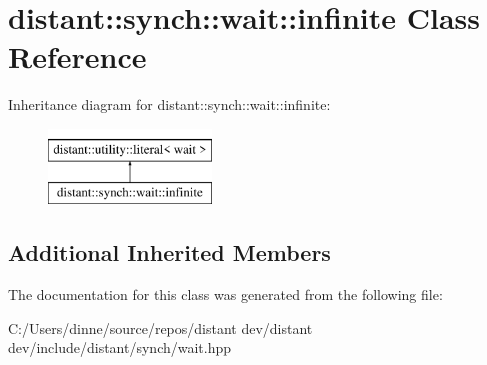 \hypertarget{classdistant_1_1synch_1_1wait_1_1infinite}{}\section{distant\+:\+:synch\+:\+:wait\+:\+:infinite Class Reference}
\label{classdistant_1_1synch_1_1wait_1_1infinite}
Inheritance diagram for distant\+:\+:synch\+:\+:wait\+:\+:infinite\+:\begin{figure}[H]
\begin{center}
\leavevmode
\includegraphics[height=2.000000cm]{classdistant_1_1synch_1_1wait_1_1infinite}
\end{center}
\end{figure}
\subsection*{Additional Inherited Members}


The documentation for this class was generated from the following file\+:\begin{DoxyCompactItemize}
\item 
C\+:/\+Users/dinne/source/repos/distant dev/distant dev/include/distant/synch/wait.\+hpp\end{DoxyCompactItemize}
